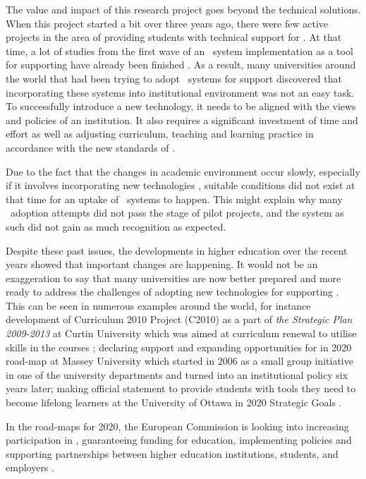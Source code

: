 The value and impact of this research project goes beyond the technical
solutions. When this project started a bit over three years ago, there were few
active projects in the area of providing students with technical support for
\LLLsn. At that time, a lot of studies from the first wave of an \ep~system
implementation as a tool for supporting \LLLs have already been finished
\citep{Batson2010}. As a result, many universities around the world that had
been trying to adopt \ep~systems for \LLLs support discovered that incorporating
these systems into institutional environment was not an easy task. To
successfully introduce a new technology, it needs to be aligned with the views
and policies of an institution. It also requires a significant investment of
time and effort as well as adjusting curriculum, teaching and learning practice
in accordance with the new standards of \LLLsn.

Due to the fact that the changes in academic environment occur slowly,
especially if it involves incorporating new technologies \citep{Molebash1999},
suitable conditions did not exist at that time for an uptake of \ep~systems to
happen. This might explain why many \ep~adoption attempts did not pass the stage
of pilot projects, and the system as such did not gain as much recognition as
expected.

Despite these past issues, the developments in higher education over the recent
years showed that important changes are happening. It would not be an
exaggeration to say that many universities are now better prepared and more
ready to address the challenges of adopting new technologies for supporting
\LLLsn. This can be seen in numerous examples around the world, for instance
development of Curriculum 2010 Project (C2010) as a part of \textit{the
Strategic Plan 2009-2013} at Curtin University which was aimed at curriculum
renewal to utilise \LLLs skills in the courses \citep{Oliver2010}; declaring
support and expanding opportunities for \LLLs in 2020 road-map at Massey
University \citep{MasseyUniversity2012} which started in 2006 as a small group
initiative in one of the university departments and turned into an institutional
policy six years later; making official statement to provide students with tools
they need to become lifelong learners at the University of Ottawa in 2020
Strategic Goals \citep{UniversityofOttawa2011}.

In the road-maps for 2020, the European Commission is looking into increasing
participation in \LLLsn, guaranteeing funding for education, implementing \LLLs
policies and supporting partnerships between higher education institutions,
students, and employers \citep{EuropeanCommission2010,EuropeanUnion2009}.

